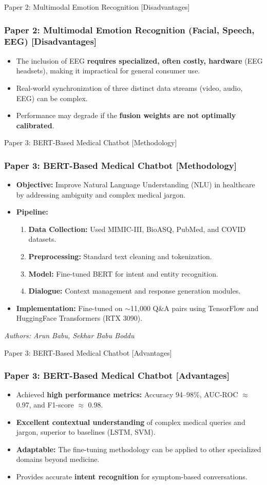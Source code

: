 \documentclass[11pt]{beamer}
\begin{document}
\begin{frame}{Paper 2: Multimodal Emotion Recognition [Disadvantages]}
\frametitle{Paper 2: Multimodal Emotion Recognition (Facial, Speech, EEG) [Disadvantages]}
\begin{itemize}
    \item The inclusion of EEG \textbf{requires specialized, often costly, hardware} (EEG headsets), making it impractical for general consumer use.
    \item Real-world synchronization of three distinct data streams (video, audio, EEG) can be complex.
    \item Performance may degrade if the \textbf{fusion weights are not optimally calibrated}.
\end{itemize}
\end{frame}

\begin{frame}{Paper 3: BERT-Based Medical Chatbot [Methodology]}
\frametitle{Paper 3: BERT-Based Medical Chatbot [Methodology]}
\begin{itemize}
    \item \textbf{Objective:} Improve Natural Language Understanding (NLU) in healthcare by addressing ambiguity and complex medical jargon.
    \item \textbf{Pipeline:}
    \begin{enumerate}
        \item \textbf{Data Collection:} Used MIMIC-III, BioASQ, PubMed, and COVID datasets.
        \item \textbf{Preprocessing:} Standard text cleaning and tokenization.
        \item \textbf{Model:} Fine-tuned BERT for intent and entity recognition.
        \item \textbf{Dialogue:} Context management and response generation modules.
    \end{enumerate}
    \item \textbf{Implementation:} Fine-tuned on $\sim$11,000 Q\&A pairs using TensorFlow and HuggingFace Transformers (RTX 3090).
\end{itemize}
\vfill
\small{\textit{Authors: Arun Babu, Sekhar Babu Boddu}}
\end{frame}

\begin{frame}{Paper 3: BERT-Based Medical Chatbot [Advantages]}
\frametitle{Paper 3: BERT-Based Medical Chatbot [Advantages]}
\begin{itemize}
    \item Achieved \textbf{high performance metrics:} Accuracy 94–98\%, AUC-ROC $\approx$ 0.97, and F1-score $\approx$ 0.98.
    \item \textbf{Excellent contextual understanding} of complex medical queries and jargon, superior to baselines (LSTM, SVM).
    \item \textbf{Adaptable:} The fine-tuning methodology can be applied to other specialized domains beyond medicine.
    \item Provides accurate \textbf{intent recognition} for symptom-based conversations.
\end{itemize}
\end{frame}
\end{document}
